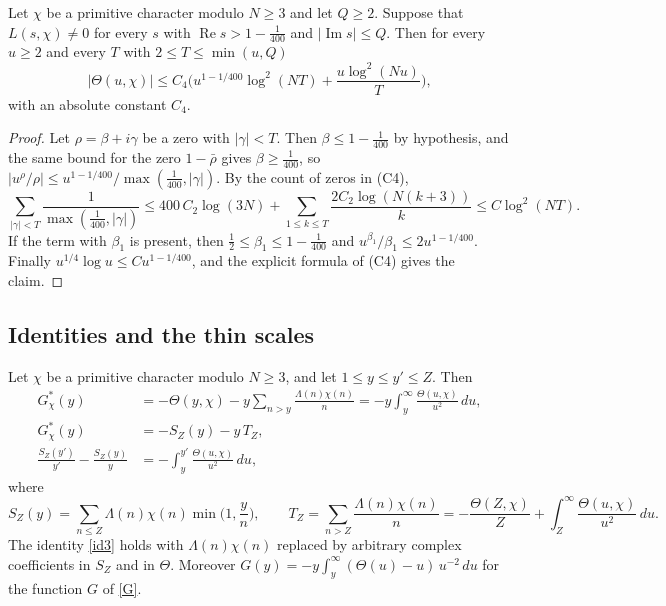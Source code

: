 \begin{lemma}\label{boxpsi}
Let $\chi$ be a primitive character modulo $N\ge3$ and let $Q\ge2$. Suppose that $L(s,\chi)\ne0$ for every $s$ with $\operatorname{Re}s>1-\frac1{400}$ and $\lvert\operatorname{Im}s\rvert\le Q$. Then for every $u\ge2$ and every $T$ with $2\le T\le\min(u,Q)$
\[
\lvert\Theta(u,\chi)\rvert\le C_4\Big(u^{1-1/400}\log^2(NT)+\frac{u\log^2(Nu)}T\Big),
\]
with an absolute constant $C_4$.
\end{lemma}

\begin{proof}
Let $\rho=\beta+i\gamma$ be a zero with $\lvert\gamma\rvert<T$. Then $\beta\le1-\frac1{400}$ by hypothesis, and the same bound for the zero $1-\bar\rho$ gives $\beta\ge\frac1{400}$, so $\lvert u^\rho/\rho\rvert\le u^{1-1/400}/\max(\frac1{400},\lvert\gamma\rvert)$. By the count of zeros in (C4),
\[
\sum_{\lvert\gamma\rvert<T}\frac1{\max(\frac1{400},\lvert\gamma\rvert)}\le400\,C_2\log(3N)+\sum_{1\le k\le T}\frac{2C_2\log(N(k+3))}{k}\le C\log^2(NT).
\]
If the term with $\beta_1$ is present, then $\frac12\le\beta_1\le1-\frac1{400}$ and $u^{\beta_1}/\beta_1\le2u^{1-1/400}$. Finally $u^{1/4}\log u\le Cu^{1-1/400}$, and the explicit formula of (C4) gives the claim.
\end{proof}

\subsection{Identities and the thin scales}

\begin{lemma}\label{gchisplit}
Let $\chi$ be a primitive character modulo $N\ge3$, and let $1\le y\le y'\le Z$. Then
\begin{align}
G^\ast_\chi(y)&=-\Theta(y,\chi)-y\sum_{n>y}\frac{\Lambda(n)\chi(n)}{n}=-y\int_y^\infty\frac{\Theta(u,\chi)}{u^2}\,du,\label{id1}\\
G^\ast_\chi(y)&=-S_Z(y)-y\,T_Z,\label{id2}\\
\frac{S_Z(y')}{y'}-\frac{S_Z(y)}{y}&=-\int_y^{y'}\frac{\Theta(u,\chi)}{u^2}\,du,\label{id3}
\end{align}
where
\[
S_Z(y)=\sum_{n\le Z}\Lambda(n)\chi(n)\min\Big(1,\frac yn\Big),\qquad T_Z=\sum_{n>Z}\frac{\Lambda(n)\chi(n)}{n}=-\frac{\Theta(Z,\chi)}{Z}+\int_Z^\infty\frac{\Theta(u,\chi)}{u^2}\,du .
\]
The identity \eqref{id3} holds with $\Lambda(n)\chi(n)$ replaced by arbitrary complex coefficients in $S_Z$ and in $\Theta$. Moreover $G(y)=-y\int_y^\infty(\Theta(u)-u)\,u^{-2}\,du$ for the function $G$ of \eqref{G}.
\end{lemma}


